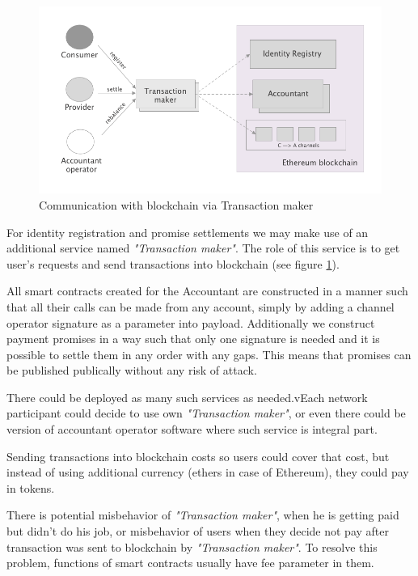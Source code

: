 \documentclass[a4paper,12pt]{article}
\begin{document}
\begin{figure}[H]
    \centering
    \includegraphics[scale=0.45]{../img/transactor}
    \caption{Communication with blockchain via Transaction maker}
    \label{img:transactor}
\end{figure}

For identity registration and promise settlements we may make use of an additional
service named \textit{"Transaction maker"}. The role of this service is to get 
user’s requests and send transactions into blockchain (see figure 
\ref{img:transactor}). 

All smart contracts created for the Accountant are constructed in a manner such 
that all their calls can be made from any account, simply by adding a channel 
operator signature as a parameter into payload. Additionally we construct payment 
promises in a way such that only one signature is needed and it is possible to 
settle them in any order with any gaps. This means that promises can be published 
publically without any risk of attack. 

There could be deployed as many such services as needed.vEach network participant 
could decide to use own \textit{"Transaction maker"}, or even there could be 
version of accountant operator software where such service is integral part.

Sending transactions into blockchain costs so users could cover that cost, but
instead of using additional currency (ethers in case of Ethereum), they could
pay in tokens.

There is potential misbehavior of \textit{"Transaction maker"}, when he is
getting paid but didn't do his job, or misbehavior of users when they decide
not pay after transaction was sent to blockchain by \textit{"Transaction 
maker"}. To resolve this problem, functions of smart contracts usually have fee
parameter in them.
\end{document}
